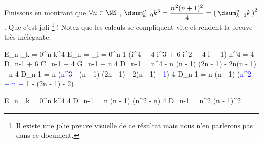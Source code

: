 \medskip


Finissons en montrant que
$\forall n \in \NN$ , $\dsum_{k = 0}^{n} k^3 = \dfrac{n^2 (n + 1)^2}{4} = \left( \, \dsum_{k = 0}^{n} k \, \right)^2$ . Que c'est joli
\footnote{
	Il existe une jolie preuve visuelle de ce résultat mais nous n'en parlerons pas dans ce document.
} !
Notez que les calculs se compliquent vite et rendent la preuve très inélégante.

\medskip

\begin{explain}[style = sar, ope = \iff]
	E_n \eqdef  \dsum_{k = 0}^{n} k^4
		\explnext{}
	E_n = \dsum_{i = 0}^{n-1} (i^4 + 4 i^3 + 6 i^2 + 4 i + 1)
		\explnext{}
	n^4 = 4 D_{n-1} + 6 C_{n-1} + 4 G_{n-1} + n
		\explnext{}
	4 D_{n-1} = n^4 - n (n - 1) (2n - 1) - 2n(n - 1) - n
		\explnext{}
	4 D_{n-1} = n (\textcolor{blue}{n^3} - (n - 1) (2n - 1) - 2(n - 1) - \textcolor{blue}{1})
	4 D_{n-1} = n (n - 1) (\textcolor{blue}{n^2 + n + 1} - (2n - 1) - 2)
\end{explain}


\begin{explain}[style = sar, ope = \iff]
	E_n \eqdef  \dsum_{k = 0}^{n} k^4
		\explnext{}
	4 D_{n-1} = n (n - 1) (n^2 - n)
		\explnext{}
	4 D_{n-1} = n^2 (n - 1)^2
\end{explain}



